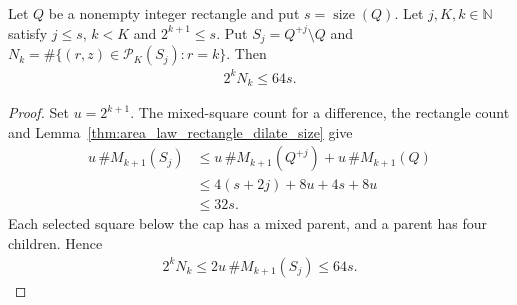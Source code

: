 \begin{lemma}
    \label{thm:area_law_rectangle_shell_selected_count}
    \leanok
    Let $Q$ be a nonempty integer rectangle and put
    $s=\operatorname{size}(Q)$.
    Let $j,K,k\in\mathbb N$ satisfy $j\le s$, $k<K$ and $2^{k+1}\le s$.
    Put $S_j=Q^{+j}\setminus Q$ and
    $N_k=\#\{(r,z)\in\mathcal P_K(S_j):r=k\}$.
    Then
    \begin{align}
        2^kN_k\le64s.
    \end{align}
\end{lemma}
\begin{proof}\leanok
    Set $u=2^{k+1}$. The mixed-square count for a difference, the rectangle
    count and Lemma~\ref{thm:area_law_rectangle_dilate_size} give
    \begin{align}
        u\,\#M_{k+1}(S_j)
         & \le u\,\#M_{k+1}(Q^{+j})+u\,\#M_{k+1}(Q) \\
         & \le4(s+2j)+8u+4s+8u                      \\
         & \le32s.
    \end{align}
    Each selected square below the cap has a mixed parent, and a parent
    has four children. Hence
    \begin{align}
        2^kN_k\le2u\,\#M_{k+1}(S_j)\le64s.
    \end{align}
\end{proof}
